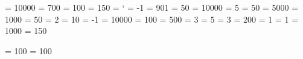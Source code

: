 \adjdemerits           = 10000
\binoppenalty          =   700
\brokenpenalty         =   100
\clubpenalty           =   150
     =   `\-
       =    -1
\delimiterfactor       =   901
\displaywidowpenalty   =    50
\doublehyphendemerits  = 10000
\errorcontextlines     =     5
\exhyphenpenalty       =    50
\finalhyphendemerits   =  5000
\hbadness              =  1000
\hyphenpenalty         =    50
\lefthyphenmin         =     2
\linepenalty           =    10
\newlinechar           =    -1
\predisplaypenalty     = 10000
\pretolerance          =   100
\relpenalty            =   500
\righthyphenmin        =     3
\showboxbreadth        =     5
\showboxdepth          =     3
\tolerance             =   200
\tracinglostchars      =     1
\uchyph                =     1
\vbadness              =  1000
\widowpenalty          =   150


\newcount \interdisplaylinepenalty
\newcount \interfootnotelinepenalty

\interdisplaylinepenalty  = 100
\interfootnotelinepenalty = 100


